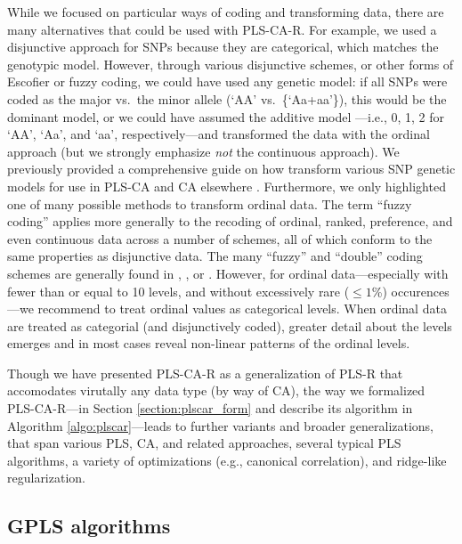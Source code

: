 \documentclass[12pt]{article}
\begin{document}
While we focused on particular ways of coding and transforming data,
there are many alternatives that could be used with PLS-CA-R. For
example, we used a disjunctive approach for SNPs because they are
categorical, which matches the genotypic model. However, through various
disjunctive schemes, or other forms of Escofier or fuzzy coding, we
could have used any genetic model: if all SNPs were coded as the major
vs.~the minor allele (`AA' vs.~\{`Aa+aa'\}), this would be the dominant
model, or we could have assumed the additive model ---i.e., 0, 1, 2 for
`AA', `Aa', and `aa', respectively---and transformed the data with the
ordinal approach (but we strongly emphasize \emph{not} the continuous
approach). We previously provided a comprehensive guide on how transform
various SNP genetic models for use in PLS-CA and CA elsewhere \citep[see
Appendix of][]{beaton_partial_2016}. Furthermore, we only highlighted
one of many possible methods to transform ordinal data. The term ``fuzzy
coding'' applies more generally to the recoding of ordinal, ranked,
preference, and even continuous data across a number of schemes, all of
which conform to the same properties as disjunctive data. The many
``fuzzy'' and ``double'' coding schemes are generally found in
\citet{escofier_traitement_1979}, \citet{lebart_multivariate_1984}, or
\citet{greenacrefuzzy}. However, for ordinal data---especially with
fewer than or equal to 10 levels, and without excessively rare
(\(\leq 1\)\%) occurences---we recommend to treat ordinal values as
categorical levels. When ordinal data are treated as categorial (and
disjunctively coded), greater detail about the levels emerges and in
most cases reveal non-linear patterns of the ordinal levels.

Though we have presented PLS-CA-R as a generalization of PLS-R that
accomodates virutally any data type (by way of CA), the way we
formalized PLS-CA-R---in Section \ref{section:plscar_form} and describe
its algorithm in Algorithm \ref{algo:plscar}---leads to further variants
and broader generalizations, that span various PLS, CA, and related
approaches, several typical PLS algorithms, a variety of optimizations
(e.g., canonical correlation), and ridge-like regularization.

\hypertarget{gpls-algorithms}{%
\subsection{GPLS algorithms}\label{gpls-algorithms}}
\end{document}
